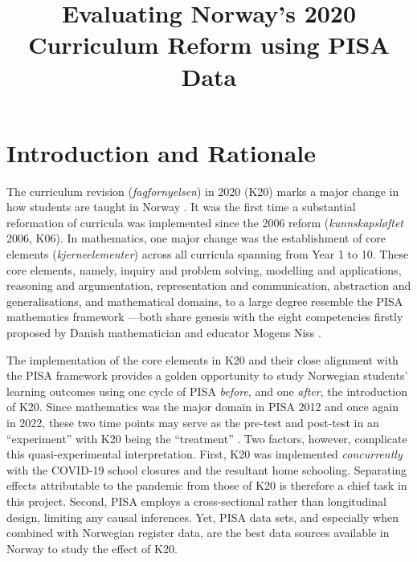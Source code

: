 \documentclass[
    a4paper,                %
    11pt,                   %
    stu,                    %
    donotrepeattitle,       %
    floatsintext,           %
    biblatex,               %
    colorlinks=true,        %
    linkcolor=red,          %
    anchorcolor=black,      %
    citecolor=blue,         %
    urlcolor=blue,          %
    bookmarks=true,         %
    bookmarksopen=false,    %
    bookmarksnumbered=true, %
    dvipsnames              %
]{apa7}
\title{Evaluating Norway's 2020 Curriculum Reform using PISA Data}
\begin{document}
\setcounter{page}{0}
\maketitle


\section{Introduction and Rationale}

The curriculum revision (\textit{fagfornyelsen}) in 2020 (K20) marks a major change in how students are taught in Norway %
. It was the first time a substantial reformation of curricula was implemented since the 2006 reform (\textit{kunnskapsl{\o}ftet} 2006, K06). In mathematics, one major change was the establishment of core elements (\textit{kjerneelementer}) across all curricula spanning from Year 1 to 10. These core elements, namely, inquiry and problem solving, modelling and applications, reasoning and argumentation, representation and communication, abstraction and generalisations, and mathematical domains, to a large degree resemble the PISA mathematics framework \parencite{oecd:2018}---both share genesis with the eight competencies firstly proposed by Danish mathematician and educator Mogens Niss \parencite{niss:2003,niss:2011,niss:2019}.

The implementation of the core elements in K20 and their close alignment with the PISA framework provides a golden opportunity to study Norwegian students' learning outcomes using one cycle of PISA \emph{before}, and one \emph{after}, the introduction of K20. Since mathematics was the major domain in PISA 2012 and once again in 2022, these two time points may serve as the pre-test and post-test in an ``experiment'' with K20 being the ``treatment'' \parencite{shadish:2002}. Two factors, however, complicate this quasi-experimental interpretation. First, K20 was implemented \emph{concurrently} with the COVID-19 school closures and the resultant home schooling. Separating effects attributable to the pandemic from those of K20 is therefore a chief task in this project. Second, PISA employs a cross-sectional rather than longitudinal design, limiting any causal inferences. Yet, PISA data sets, and especially when combined with Norwegian register data, are the best data sources available in Norway to study the effect of K20.
\end{document}
